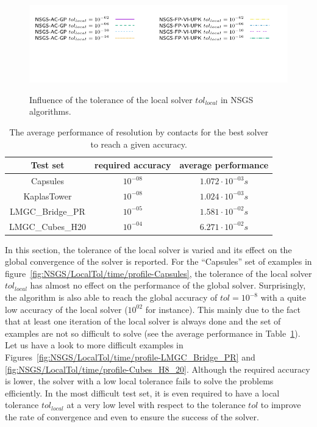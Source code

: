 \begin{figure}
{     \hspace{-1cm}\includegraphics[width=\widthfigure\textwidth]{../figure/NSGS/LocalTol/time/profile-LMGC_Cubes_H8_20_legend.pdf}}
  \caption{Influence of the tolerance of the local solver $tol_{local}$ in NSGS algorithms.} 
\end{figure}



\begin{table}[htbp]
  \centering
  \begin{tabular}{|c|c|c|}
    \hline
    Test set & required accuracy &  average performance \\
    \hline
    \hline
    Capsules & $10^{-08}$ & $ 1.072 \cdot 10^{-03} s$ \\
    KaplasTower & $10^{-08}$ &  $1.024 \cdot 10^{-03} s$ \\
    LMGC\_Bridge\_PR & $10^{-05}$&$1.581 \cdot 10^{-02} s $ \\
    LMGC\_Cubes\_H20 &$10^{-04}$ &$6.271 \cdot 10^{-02} s $\\
    \hline
  \end{tabular}
  \caption{The average performance of resolution by contacts for the best solver to reach a given accuracy.}
  \label{tab:hardness}
\end{table}



In this section, the tolerance of the local solver is varied and its effect on the global convergence of the solver is reported. For the ``Capsules'' set of examples in figure~\ref{fig:NSGS/LocalTol/time/profile-Capsules}, the tolerance of the local solver $tol_{local}$ has almost no effect on the performance of the global solver. Surprisingly, the algorithm is also able to reach the global accuracy of $tol = 10^{-8}$ with a quite low accuracy of the local solver ($10^{02}$ for instance). This mainly due to the fact that at least one iteration of the local solver is always done and the set of examples are not so difficult to solve (see the average performance in Table~\ref{tab:hardness}).
Let us have a look to more difficult examples in Figures~\ref{fig:NSGS/LocalTol/time/profile-LMGC_Bridge_PR} and  \ref{fig:NSGS/LocalTol/time/profile-Cubes_H8_20}. Although the required accuracy is lower, the solver with a low local tolerance fails to solve the problems efficiently. In the most difficult test set, it is even required to have a local tolerance $tol_{local}$ at a very low level with respect to the tolerance $tol$ to improve the rate of convergence and even to ensure the success of the solver.

